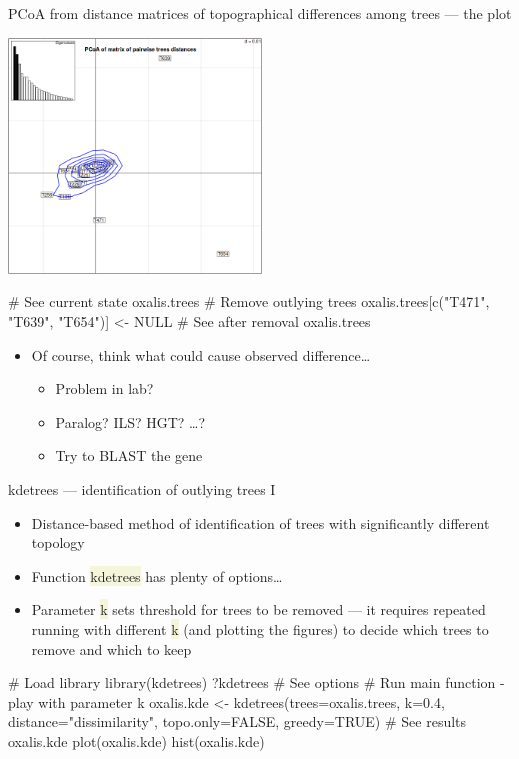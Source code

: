 \documentclass[compress, ucs, xelatex, 11pt, xcolor=svgnames, aspectratio=169,
	hyperref={
		bookmarks=true,
		unicode=true,
		colorlinks=true,
		pdftitle={Molecular data in R},
		plainpages=false,
		pdfauthor={Vojtech Zeisek},
		pdfsubject={Course about phylogeny and evolution in R},
		pdfcreator={XeLaTeX},
		pdfkeywords={R, evolution, phylogeny, molecular data},
		linkcolor=Crimson, %
		anchorcolor=Magenta, %
		citecolor=Magenta, %
		filecolor=Magenta, %
		menucolor=Magenta, %
		urlcolor=DodgerBlue, %
		pdftex},
	url={hyphens, lowtilde} %
	]{beamer}
\renewcommand{\texttt}[1]{\colorbox{Beige}{{\ttfamily #1}}}
\begin{document}
\begin{frame}[fragile]{PCoA from distance matrices of topographical differences among trees --- the plot}
	\begin{multicols}{2}
		\begin{center}
			\includegraphics[height=6.25cm]{pcoa-trees.png}
		\end{center}
		\begin{spluscode}
    # See current state
    oxalis.trees
    # Remove outlying trees
    oxalis.trees[c("T471", "T639",
      "T654")] <- NULL
    # See after removal
    oxalis.trees
		\end{spluscode}
		\begin{itemize}
			\item Of course, think what could cause observed difference\ldots
			\begin{itemize}
				\item Problem in lab?
				\item Paralog? ILS? HGT? \ldots ?
				\item Try to BLAST the gene
			\end{itemize}
		\end{itemize}
	\end{multicols}
\end{frame}

\begin{frame}[fragile]{kdetrees --- identification of outlying trees I}
	\begin{itemize}
		\item Distance-based method of identification of trees with significantly different topology
		\item Function \texttt{kdetrees} has plenty of options\ldots
		\item Parameter \texttt{k} sets threshold for trees to be removed --- it requires repeated running with different \texttt{k} (and plotting the figures) to decide which trees to remove and which to keep
	\end{itemize}
	\begin{spluscode}
    # Load library
    library(kdetrees)
    ?kdetrees # See options
    # Run main function - play with parameter k
    oxalis.kde <- kdetrees(trees=oxalis.trees, k=0.4,
      distance="dissimilarity", topo.only=FALSE, greedy=TRUE)
    # See results
    oxalis.kde
    plot(oxalis.kde)
    hist(oxalis.kde)
	\end{spluscode}
\end{frame}
\end{document}
